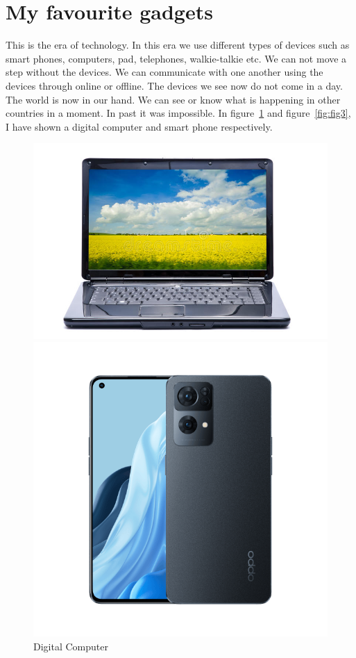 \section{My favourite gadgets}
This is the era of technology. In this era we use different types of devices such as smart phones, computers, pad, telephones, walkie-talkie etc. We can not move a step without the devices. We can communicate with one another using the devices through online or offline. The  devices we see now do not come in a day. The world is now in our hand. We can see or know what is happening in other countries in a moment. In past it was impossible. In figure~\ref{fig:fig2} and figure~\ref{fig:fig3}, I have shown a digital computer and smart phone respectively.
\begin{figure}[h]
    \centering
    \begin{minipage}[b]{.49\textwidth}
    \includegraphics[width = 1\linewidth]{pic/laptop.jpg}
     \caption{Digital Computer} 
     \label{fig:fig2}
    \end{minipage}
    \begin{minipage}[b]{.48\textwidth}
    \includegraphics[width = 1\linewidth]{pic/smart_phone.png}

\end{minipage}
\end{figure}
